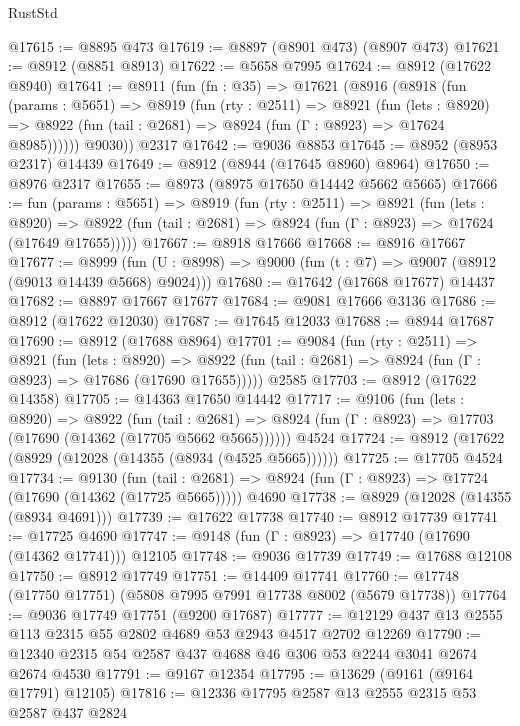 \begin{lexlean}{RustStd}
\begin{coremodule}
@17615 := @8895 @473
@17619 := @8897 (@8901 @473) (@8907 @473)
@17621 := @8912 (@8851 @8913)
@17622 := @5658 @7995
@17624 := @8912 (@17622 @8940)
@17641 := @8911
    (fun (fn : @35) =>
    @17621
      (@8916
        (@8918
          (fun (params : @5651) =>
          @8919
            (fun (rty : @2511) =>
            @8921
              (fun (lets : @8920) =>
              @8922 (fun (tail : @2681) => @8924 (fun (Γ : @8923) => @17624 @8985))))))
        @9030))
    @2317
@17642 := @9036 @8853
@17645 := @8952 (@8953 @2317) @14439
@17649 := @8912 (@8944 (@17645 @8960) @8964)
@17650 := @8976 @2317
@17655 := @8973 (@8975 @17650 @14442 @5662 @5665)
@17666 := fun (params : @5651) =>
  @8919
    (fun (rty : @2511) =>
    @8921
      (fun (lets : @8920) =>
      @8922 (fun (tail : @2681) => @8924 (fun (Γ : @8923) => @17624 (@17649 @17655)))))
@17667 := @8918 @17666
@17668 := @8916 @17667
@17677 := @8999
    (fun (U : @8998) => @9000 (fun (t : @7) => @9007 (@8912 (@9013 @14439 @5668) @9024)))
@17680 := @17642 (@17668 @17677) @14437
@17682 := @8897 @17667 @17677
@17684 := @9081 @17666 @3136
@17686 := @8912 (@17622 @12030)
@17687 := @17645 @12033
@17688 := @8944 @17687
@17690 := @8912 (@17688 @8964)
@17701 := @9084
    (fun (rty : @2511) =>
    @8921
      (fun (lets : @8920) =>
      @8922 (fun (tail : @2681) => @8924 (fun (Γ : @8923) => @17686 (@17690 @17655)))))
    @2585
@17703 := @8912 (@17622 @14358)
@17705 := @14363 @17650 @14442
@17717 := @9106
    (fun (lets : @8920) =>
    @8922
      (fun (tail : @2681) =>
      @8924 (fun (Γ : @8923) => @17703 (@17690 (@14362 (@17705 @5662 @5665))))))
    @4524
@17724 := @8912 (@17622 (@8929 (@12028 (@14355 (@8934 (@4525 @5665))))))
@17725 := @17705 @4524
@17734 := @9130
    (fun (tail : @2681) => @8924 (fun (Γ : @8923) => @17724 (@17690 (@14362 (@17725 @5665)))))
    @4690
@17738 := @8929 (@12028 (@14355 (@8934 @4691)))
@17739 := @17622 @17738
@17740 := @8912 @17739
@17741 := @17725 @4690
@17747 := @9148 (fun (Γ : @8923) => @17740 (@17690 (@14362 @17741))) @12105
@17748 := @9036 @17739
@17749 := @17688 @12108
@17750 := @8912 @17749
@17751 := @14409 @17741
@17760 := @17748 (@17750 @17751) (@5808 @7995 @7991 @17738 @8002 (@5679 @17738))
@17764 := @9036 @17749 @17751 (@9200 @17687)
@17777 := @12129 @437 @13 @2555 @113 @2315 @55 @2802 @4689 @53 @2943 @4517 @2702 @12269
@17790 := @12340 @2315 @54 @2587 @437 @4688 @46 @306 @53 @2244 @3041 @2674 @2674 @4530
@17791 := @9167 @12354
@17795 := @13629 (@9161 (@9164 @17791) @12105)
@17816 := @12336
    @17795
    @2587
    @13
    @2555
    @2315
    @53
    @2587
    @437
    @2824

\end{coremodule}
\end{lexlean}
